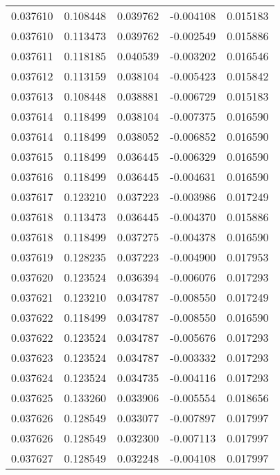 \begin{tabular}{lrrrr}
0.037610    &  0.108448 &  0.039762 & -0.004108 &             0.015183 \\
0.037610    &  0.113473 &  0.039762 & -0.002549 &             0.015886 \\
0.037611    &  0.118185 &  0.040539 & -0.003202 &             0.016546 \\
0.037612    &  0.113159 &  0.038104 & -0.005423 &             0.015842 \\
0.037613    &  0.108448 &  0.038881 & -0.006729 &             0.015183 \\
0.037614    &  0.118499 &  0.038104 & -0.007375 &             0.016590 \\
0.037614    &  0.118499 &  0.038052 & -0.006852 &             0.016590 \\
0.037615    &  0.118499 &  0.036445 & -0.006329 &             0.016590 \\
0.037616    &  0.118499 &  0.036445 & -0.004631 &             0.016590 \\
0.037617    &  0.123210 &  0.037223 & -0.003986 &             0.017249 \\
0.037618    &  0.113473 &  0.036445 & -0.004370 &             0.015886 \\
0.037618    &  0.118499 &  0.037275 & -0.004378 &             0.016590 \\
0.037619    &  0.128235 &  0.037223 & -0.004900 &             0.017953 \\
0.037620    &  0.123524 &  0.036394 & -0.006076 &             0.017293 \\
0.037621    &  0.123210 &  0.034787 & -0.008550 &             0.017249 \\
0.037622    &  0.118499 &  0.034787 & -0.008550 &             0.016590 \\
0.037622    &  0.123524 &  0.034787 & -0.005676 &             0.017293 \\
0.037623    &  0.123524 &  0.034787 & -0.003332 &             0.017293 \\
0.037624    &  0.123524 &  0.034735 & -0.004116 &             0.017293 \\
0.037625    &  0.133260 &  0.033906 & -0.005554 &             0.018656 \\
0.037626    &  0.128549 &  0.033077 & -0.007897 &             0.017997 \\
0.037626    &  0.128549 &  0.032300 & -0.007113 &             0.017997 \\
0.037627    &  0.128549 &  0.032248 & -0.004108 &             0.017997 \\

\end{tabular}
